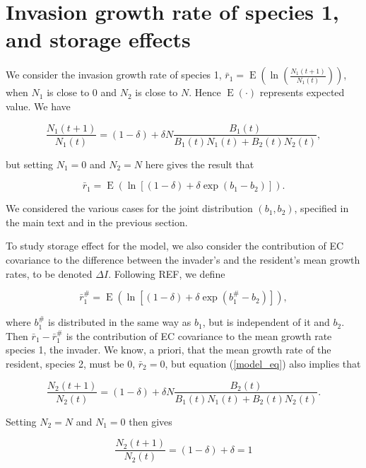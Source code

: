 \documentclass[letterpaper,11pt]{article}
\DeclareMathOperator{\EX}{E}%
\begin{document}
\section{Invasion growth rate of species 1, and storage effects} \label{sect:IGR}

We consider the invasion growth rate of species 1, $\bar r_1=\EX(\ln (\frac{N_1(t+1)}{N_1(t)}))$, when $N_1$ is close to 0 and $N_2$ is close to $N$.
Hence $\EX(\cdot)$ represents expected value.
We have 

\begin{equation}
\frac{N_1(t+1)}{N_1(t)}=(1-\delta)+\delta N \frac{B_1(t)}{B_1(t)N_1(t)+B_2(t)N_2(t)},  \label{sp1_Nt+1_over_Nt}
\end{equation}

\noindent but setting $N_1=0$ and $N_2=N$ here gives the result that

\begin{equation}
\bar r_1=\EX(\ln [(1-\delta)+\delta \exp(b_1-b_2)]).  \label{rbar1_E}
\end{equation}

\noindent We considered the various cases for the joint distribution $(b_1,b_2)$, specified in the main text and in the previous section. 

To study storage effect for the model, we also consider the contribution of EC covariance to the difference between the invader's and the resident's mean growth rates, to be denoted $\Delta I$. 
Following REF, we define 

\begin{equation}
\bar r_1^\#=\EX(\ln [(1-\delta)+\delta \exp (b_1^\#-b_2)]),  \label{rbar1sharp_E}
\end{equation}

\noindent where $b_1^\#$ is distributed in the same way as $b_1$, but is independent of it and $b_2$. 
Then $\bar r_1 - \bar r_1^\#$ is the contribution of EC covariance to the mean growth rate species 1, the invader. 
We know, a priori, that the mean growth rate of the resident, species 2, must be 0, $\bar r_2 =0$, but equation (\ref{model_eq}) also implies that

\begin{equation}
\frac{N_2(t+1)}{N_2(t)}=(1-\delta)+\delta N \frac{B_2(t)}{B_1(t)N_1(t)+B_2(t)N_2(t)}.  \label{sp2_Nt+1_over_Nt}
\end{equation}

\noindent Setting $N_2=N$ and $N_1=0$ then gives

\begin{equation}
\frac{N_2(t+1)}{N_2(t)}=(1-\delta)+\delta=1  \label{sp2_Nt+1_over_Nt_simp}
\end{equation}
\end{document}
